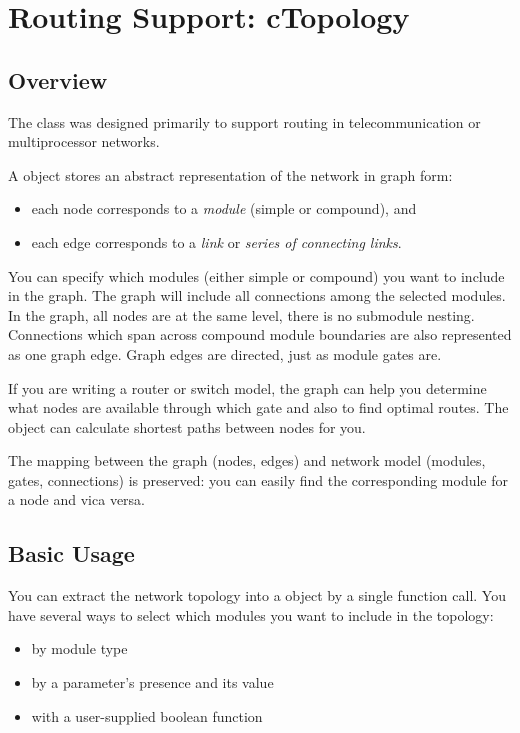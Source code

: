 \section{Routing Support: cTopology}

\subsection{Overview}

The  class was designed primarily to support
routing in telecommunication or multiprocessor
networks.

A  object stores an abstract representation of the
network in graph form:
\begin{itemize}
  \item{each  node corresponds to a \textit{module}
    (simple or compound), and}
  \item{each  edge corresponds to a \textit{link} or
    \textit{series of connecting links}.}
\end{itemize}

You can specify which modules (either simple or compound) you want to
include in the graph. The graph will include all connections among the
selected modules. In the graph, all nodes are at the same level,
there is no submodule nesting.  Connections which span across compound
module boundaries are also represented as one graph edge. Graph edges
are directed, just as module gates are.


If you are writing a router or switch model, the 
graph can help you determine what nodes are available through which
gate and also to find optimal routes. The
 object can calculate shortest paths between nodes for you.

The mapping between the graph (nodes, edges) and network model
(modules, gates, connections) is preserved: you can easily find
the corresponding module for a  node and vica versa.





\subsection{Basic Usage}

You can extract the network topology into a 
object by a single function call. You have several ways to select
which modules you want to include in the topology:
\begin{itemize}
  \item{by module type}
  \item{by a parameter's presence and its value}
  \item{with a user-supplied boolean function}
\end{itemize}

